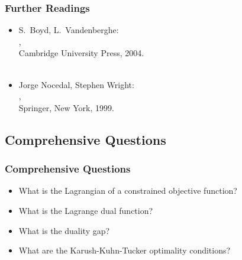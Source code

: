 \begin{frame}
  \frametitle{Further Readings}

  \begin{itemize}
    \item S.~Boyd, L.~Vandenberghe: \\
      , \\
      Cambridge University Press, 2004. \\
       \\[.25cm]
    \item Jorge Nocedal, Stephen Wright: \\
      , \\
      Springer, New York, 1999.
  \end{itemize}
\end{frame}


\subsection{Comprehensive Questions}

\begin{frame}
  \frametitle{Comprehensive Questions}

  \begin{itemize}
    \item What is the Lagrangian of a constrained objective function? \\[1cm]
    \item What is the Lagrange dual function? \\[1cm]
    \item What is the duality gap? \\[1cm]
    \item What are the Karush-Kuhn-Tucker optimality conditions?
  \end{itemize}
\end{frame}
